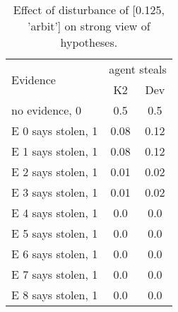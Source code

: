 \begin{table}\begin{tabular}{l|cc}\toprule\multirow{2}{*}{Evidence} & \multicolumn{2}{c}{agent steals}\\& {K2} & {Dev}\\\midrule
no evidence, 0 & 0.5&0.5\\E 0 says stolen, 1 & 0.08&0.12\\E 1 says stolen, 1 & 0.08&0.12\\E 2 says stolen, 1 & 0.01&0.02\\E 3 says stolen, 1 & 0.01&0.02\\E 4 says stolen, 1 & 0.0&0.0\\E 5 says stolen, 1 & 0.0&0.0\\E 6 says stolen, 1 & 0.0&0.0\\E 7 says stolen, 1 & 0.0&0.0\\E 8 says stolen, 1 & 0.0&0.0\\\bottomrule\end{tabular}\caption{Effect of disturbance of [0.125, 'arbit'] on strong view of hypotheses.}\end{table}